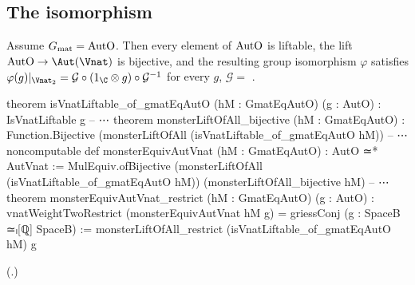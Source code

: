 \subsection{The isomorphism}

\begin{theorem}\label{ch22:thm:equiv}
Assume $G_{\mathrm{mat}}=\mathrm{AutO}$.  Then every element of $\mathrm{AutO}$ is liftable, the lift
$\chtwentytwoAutO\to\Aut(\Vnat)$ is bijective, and the resulting group isomorphism $\varphi$ satisfies
$\varphi(g)|_{\Vnat_2}=\mathcal G\circ(1_\C\otimes g)\circ\mathcal G^{-1}$ for every $g$, $\mathcal G=$ .
\end{theorem}
\begin{leancode}
theorem isVnatLiftable_of_gmatEqAutO (hM : GmatEqAutO) (g : AutO) : IsVnatLiftable g
-- ⋯
theorem monsterLiftOfAll_bijective (hM : GmatEqAutO) :
    Function.Bijective (monsterLiftOfAll (isVnatLiftable_of_gmatEqAutO hM))
-- ⋯
noncomputable def monsterEquivAutVnat (hM : GmatEqAutO) : AutO ≃* AutVnat :=
  MulEquiv.ofBijective (monsterLiftOfAll (isVnatLiftable_of_gmatEqAutO hM))
    (monsterLiftOfAll_bijective hM)
-- ⋯
theorem monsterEquivAutVnat_restrict (hM : GmatEqAutO) (g : AutO) :
    vnatWeightTwoRestrict (monsterEquivAutVnat hM g) =
      griessConj (g : SpaceB ≃ₗ[ℚ] SpaceB) :=
  monsterLiftOfAll_restrict (isVnatLiftable_of_gmatEqAutO hM) g
\end{leancode}
(.)
